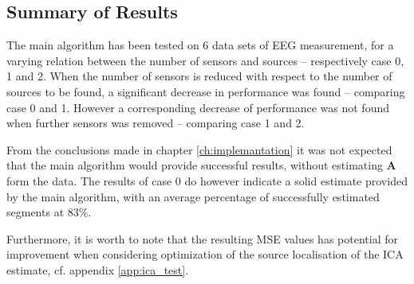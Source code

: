 

\subsection{Summary of Results}
The main algorithm has been tested on 6 data sets of EEG measurement, for a varying relation between the number of sensors and sources -- respectively case 0, 1 and 2.
When the number of sensors is reduced with respect to the number of sources to be found, a significant decrease in performance was found -- comparing case 0 and 1. 
However a corresponding decrease of performance was not found when further sensors was removed -- comparing case 1 and 2. 

From the conclusions made in chapter \ref{ch:implemantation} it was not expected that the main algorithm would provide successful results, without estimating $\textbf{A}$ form the data. 
The results of case 0 do however indicate a solid estimate provided by the main algorithm, with an average percentage of successfully estimated segments at $83\%$. 

Furthermore, it is worth to note that the resulting MSE values has potential for improvement when considering optimization of the source localisation of the ICA estimate, cf. appendix \ref{app:ica_test}.




